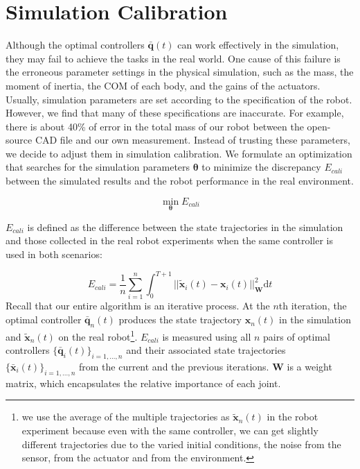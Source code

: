 \section{Simulation Calibration}

Although the optimal controllers $\bar{\mathbf{q}}(t)$ can work effectively in the simulation, they may fail to achieve the tasks in the real world. One cause of this failure is the erroneous parameter settings in the physical simulation, such as the mass, the moment of inertia, the COM of each body, and the gains of the actuators. Usually, simulation parameters are set according to the specification of the robot. However, we find that many of these specifications are inaccurate. For example, there is about 40\% of error in the total mass of our robot between the open-source CAD file and our own measurement. Instead of trusting these parameters, we decide to adjust them in simulation calibration. We formulate an optimization that searches for the simulation parameters $\mathbf{\theta}$ to minimize the discrepancy $E_{cali}$ between the simulated results and the robot performance in the real environment.

\begin{equation}
 \min_{\mathbf{\theta}} E_{cali}
\label{eqn:calibration}
\end{equation}

$E_{cali}$ is defined as the difference between the state trajectories in the simulation and those collected in the real robot experiments when the same controller is used in both scenarios:

\begin{equation}
  E_{cali}=\frac{1}{n}\sum_{i=1}^{n}\int_{0}^{T+1}||\tilde{\mathbf{x}}_i(t)-\mathbf{x}_i(t)||_{\mathbf{W}}^2\mathrm{d}t
  \label{eqn:calibrationObj}
\end{equation}
Recall that our entire algorithm is an iterative process. At the $n$th iteration, the optimal controller $\bar{\mathbf{q}}_n(t)$ produces the state trajectory $\mathbf{x}_n(t)$ in the simulation and $\tilde{\mathbf{x}}_n(t)$ on the real robot\footnote{we use the average of the multiple trajectories as $\tilde{\mathbf{x}}_n(t)$ in the robot experiment because even with the same controller, we can get slightly different trajectories due to the varied initial conditions, the noise from the sensor, from the actuator and from the environment.}. $E_{cali}$ is measured using all $n$ pairs of optimal controllers $\{\bar{\mathbf{q}}_i(t)\}_{i=1,...,n}$ and their associated state trajectories $\{\bar{\mathbf{x}}_i(t)\}_{i=1,...,n}$ from the current and the previous iterations.  $\mathbf{W}$ is a weight matrix, which encapsulates the relative importance of each joint.

